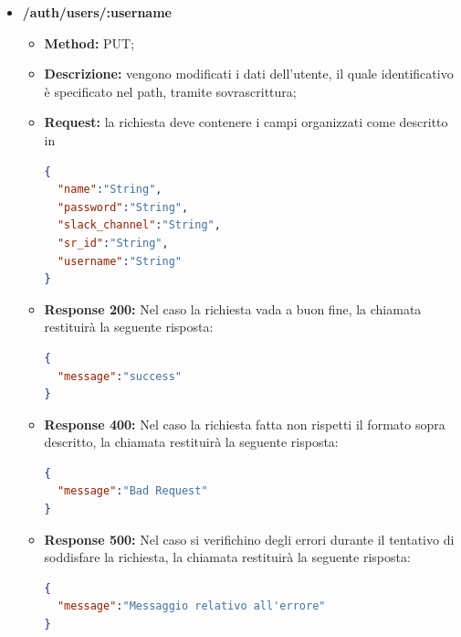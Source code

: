 \begin{itemize}
\begin{itemize}
\item \textbf{Response 200:} Nel caso la richiesta vada a buon fine, la chiamata restituirà la seguente risposta:
\begin{lstlisting}[language=json,firstnumber=1]
{
  "message":"success"
}
\end{lstlisting}
\item \textbf{Response 400:} Nel caso la richiesta fatta non rispetti il formato sopra descritto, la chiamata restituirà la seguente risposta:
\begin{lstlisting}[language=json,firstnumber=1]
{
  "message":"Bad Request"
}
\end{lstlisting}
\item \textbf{Response 500:} Nel caso si verifichino degli errori durante il tentativo di soddisfare la richiesta, la chiamata restituirà la seguente risposta:
\begin{lstlisting}[language=json,firstnumber=1]
{
  "message":"Messaggio relativo all'errore"
}
\end{lstlisting}\end{itemize}

\item \textbf{/auth/users/:username}\\

\begin{itemize}
\item \textbf{Method:} PUT;
\item \textbf{Descrizione:} vengono modificati i dati dell'utente, il quale identificativo è specificato nel path, tramite sovrascrittura;
\item \textbf{Request:} la richiesta deve contenere i campi organizzati come descritto in \\
\begin{lstlisting}[language=json,firstnumber=1]
{
  "name":"String",
  "password":"String",
  "slack_channel":"String",
  "sr_id":"String",
  "username":"String"
}
\end{lstlisting}

\item \textbf{Response 200:} Nel caso la richiesta vada a buon fine, la chiamata restituirà la seguente risposta:
\begin{lstlisting}[language=json,firstnumber=1]
{
  "message":"success"
}
\end{lstlisting}
\item \textbf{Response 400:} Nel caso la richiesta fatta non rispetti il formato sopra descritto, la chiamata restituirà la seguente risposta:
\begin{lstlisting}[language=json,firstnumber=1]
{
  "message":"Bad Request"
}
\end{lstlisting}
\item \textbf{Response 500:} Nel caso si verifichino degli errori durante il tentativo di soddisfare la richiesta, la chiamata restituirà la seguente risposta:
\begin{lstlisting}[language=json,firstnumber=1]
{
  "message":"Messaggio relativo all'errore"
}
\end{lstlisting}
\end{itemize}


\end{itemize}
